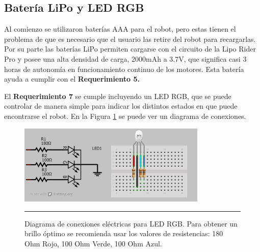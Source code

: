 
\subsection{Batería LiPo y LED RGB}

Al comienzo se utilizaron baterías AAA para el robot, pero estas tienen el problema de que es necesario que el usuario las retire del robot para recargarlas. Por su parte las baterías LiPo permiten cargarse con el circuito de la Lipo Rider Pro y posee una alta densidad de carga, 2000mAh a 3.7V, que significa casi 3 horas de autonomía en funcionamiento continuo de los motores. Esta batería ayuda a cumplir con el \textbf{Requerimiento 5.}

El \textbf{Requerimiento 7} se cumple incluyendo un LED RGB, que se puede controlar de manera simple para indicar los distintos estados en que puede encontrarse el robot. En la Figura \ref{fig:LED} se puede ver un diagrama de conexiones.

\begin{figure}[htbp]
	\centering
		\includegraphics[width=0.8\textwidth]{./Figures/MODI/RGBLED.png}
		\rule{35em}{0.5pt}
	\caption[Conexión eléctrica LED RGB]{Diagrama de conexiones eléctricas para LED RGB. Para obtener un brillo óptimo se recomienda usar los valores de resistencias: 180 Ohm Rojo, 100 Ohm Verde, 100 Ohm Azul.}
	\label{fig:LED}
\end{figure}

